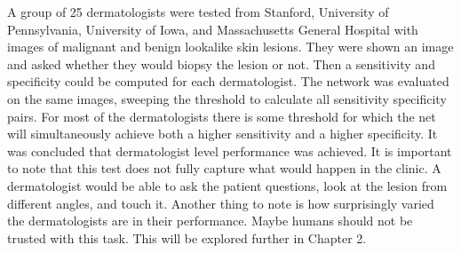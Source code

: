 A group of 25 dermatologists were tested from Stanford, University of Pennsylvania, University of Iowa, and Massachusetts General Hospital with images of malignant and benign lookalike skin lesions.  They were shown an image and asked whether they would biopsy the lesion or not.  Then a sensitivity and specificity could be computed for each dermatologist.  The network was evaluated on the same images, sweeping the threshold to calculate all sensitivity specificity pairs.  For most of the dermatologists there is some threshold for which the net will simultaneously achieve both a higher sensitivity and a higher specificity.  It was concluded that dermatologist level performance was achieved.  It is important to note that this test does not fully capture what would happen in the clinic.  A dermatologist would be able to ask the patient questions, look at the lesion from different angles, and touch it.  Another thing to note is how surprisingly varied the dermatologists are in their performance.  Maybe humans should not be trusted with this task.  This will be explored further in Chapter 2.


